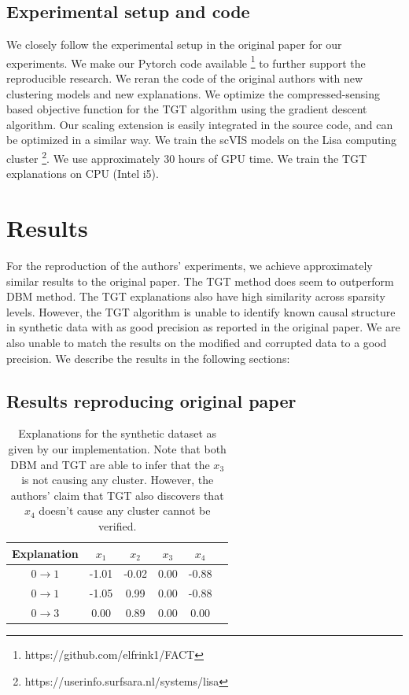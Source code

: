 \subsection{Experimental setup and code}
We closely follow the experimental setup in the original paper for our experiments. We make our Pytorch code available \footnote{https://github.com/elfrink1/FACT} to further support the reproducible research. We reran the code of the original authors with new clustering models and new explanations. We optimize the compressed-sensing based objective function for the TGT algorithm using the gradient descent algorithm. Our scaling extension is easily integrated in the source code, and can be optimized in a similar way. We train the scVIS models on the Lisa computing cluster \footnote{https://userinfo.surfsara.nl/systems/lisa}. We use approximately $30$ hours of GPU time. We train the TGT explanations on CPU (Intel i5).

\section{Results}
\label{sec:results}
For the reproduction of the authors' experiments, we achieve approximately similar results to the original paper. The TGT method does seem to outperform DBM method. The TGT explanations also have high similarity across sparsity levels. However, the TGT algorithm is unable to identify known causal structure in synthetic data with as good precision as reported in the original paper. We are also unable to match the results on the modified and corrupted data to a good precision. We describe the results in the following sections:
\subsection{Results reproducing original paper}
\begin{table}
\begin{center}
\begin{tabular}{|c|c|c|c|c|c|}
\hline
    \bf{Explanation} & $x_1$ & $x_2$ & $x_3$ & $x_4$\\
    \hline
    $0 \rightarrow 1$ & -1.01 & -0.02 & 0.00 & -0.88\\
    $0 \rightarrow 1$ & -1.05 & 0.99 & 0.00 & -0.88\\
    $0 \rightarrow 3$ & 0.00 & 0.89 & 0.00 & 0.00\\
    \hline
\end{tabular}
\caption{Explanations for the synthetic dataset as given by our implementation. Note that both DBM and TGT are able to infer that the $x_3$ is not causing any cluster. However, the authors' claim that TGT also discovers that $x_4$ doesn't cause any cluster cannot be verified.}
\label{tab:synth}
\end{center}
\end{table}

